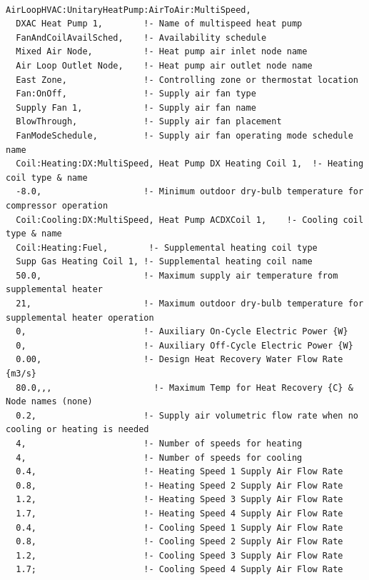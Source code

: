 \begin{lstlisting}

AirLoopHVAC:UnitaryHeatPump:AirToAir:MultiSpeed,
  DXAC Heat Pump 1,        !- Name of multispeed heat pump
  FanAndCoilAvailSched,    !- Availability schedule
  Mixed Air Node,          !- Heat pump air inlet node name
  Air Loop Outlet Node,    !- Heat pump air outlet node name
  East Zone,               !- Controlling zone or thermostat location
  Fan:OnOff,               !- Supply air fan type
  Supply Fan 1,            !- Supply air fan name
  BlowThrough,             !- Supply air fan placement
  FanModeSchedule,         !- Supply air fan operating mode schedule name
  Coil:Heating:DX:MultiSpeed, Heat Pump DX Heating Coil 1,  !- Heating coil type & name
  -8.0,                    !- Minimum outdoor dry-bulb temperature for compressor operation
  Coil:Cooling:DX:MultiSpeed, Heat Pump ACDXCoil 1,    !- Cooling coil type & name
  Coil:Heating:Fuel,        !- Supplemental heating coil type
  Supp Gas Heating Coil 1, !- Supplemental heating coil name
  50.0,                    !- Maximum supply air temperature from supplemental heater
  21,                      !- Maximum outdoor dry-bulb temperature for supplemental heater operation
  0,                       !- Auxiliary On-Cycle Electric Power {W}
  0,                       !- Auxiliary Off-Cycle Electric Power {W}
  0.00,                    !- Design Heat Recovery Water Flow Rate {m3/s}
  80.0,,,                    !- Maximum Temp for Heat Recovery {C} & Node names (none)
  0.2,                     !- Supply air volumetric flow rate when no cooling or heating is needed
  4,                       !- Number of speeds for heating
  4,                       !- Number of speeds for cooling
  0.4,                     !- Heating Speed 1 Supply Air Flow Rate
  0.8,                     !- Heating Speed 2 Supply Air Flow Rate
  1.2,                     !- Heating Speed 3 Supply Air Flow Rate
  1.7,                     !- Heating Speed 4 Supply Air Flow Rate
  0.4,                     !- Cooling Speed 1 Supply Air Flow Rate
  0.8,                     !- Cooling Speed 2 Supply Air Flow Rate
  1.2,                     !- Cooling Speed 3 Supply Air Flow Rate
  1.7;                     !- Cooling Speed 4 Supply Air Flow Rate


\end{lstlisting}

